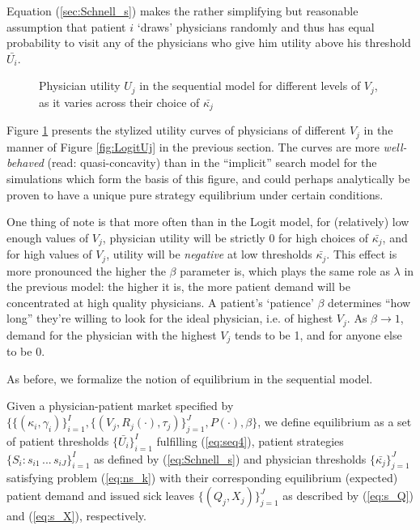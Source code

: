\documentclass[../main.tex]{subfiles}
\begin{document}
Equation (\ref{sec:Schnell_s}) makes the rather simplifying but reasonable assumption that patient $i$ `draws' physicians randomly and thus has equal probability to visit any of the physicians who give him utility above his threshold $\bar{U_i}$.

\vspace{-3em}

\begin{figure}[H]
    \centering
    \begin{tikzpicture}[scale=0.6]
    
    \end{tikzpicture}
    \caption{Physician utility $U_j$ in the sequential model for different levels of $V_j$,\\ as it varies across their choice of $\bar{\kappa_j}$}
    \label{fig:SchnellUj}
\end{figure}

Figure \ref{fig:SchnellUj} presents the stylized utility curves of physicians of different $V_j$ in the manner of Figure \ref{fig:LogitUj} in the previous section. The curves are more \textit{well-behaved} (read: quasi-concavity) than in the ``implicit'' search model for the simulations which form the basis of this figure, and could perhaps analytically be proven to have a unique pure strategy equilibrium under certain conditions.

One thing of note is that more often than in the Logit model, for (relatively) low enough values of $V_j$, physician utility will be strictly 0 for high choices of $\bar{\kappa_j}$, and for high values of $V_j$, utility will be \textit{negative} at low thresholds $\bar{\kappa_j}$. This effect is more pronounced the higher the $\beta$ parameter is, which plays the same role as $\lambda$ in the previous model: the higher it is, the more patient demand will be concentrated at high quality physicians. A patient's `patience' $\beta$ determines ``how long'' they're willing to look for the ideal physician, i.e. of highest $V_j$. As $\beta \rightarrow 1$, demand for the physician with the highest $V_j$ tends to be 1, and for anyone else to be 0.

As before, we formalize the notion of equilibrium in the sequential model.

\vspace{0.5em}
\begin{equilibrium}
    \label{Schnell_eq}
Given a physician-patient market specified by $\{\{(\kappa_i,\gamma_i)\}_{i =1}^{I},\{(V_j, R_j(\cdot), \tau_j)\}_{j =1}^{J}, P(\cdot), \beta \}$, we define equilibrium as a set of patient thresholds $\{\bar{U_i}\}_{i =1}^{I}$ fulfilling (\ref{eq:seq4}), patient strategies $\{S_i: s_{i1} \, ... \, s_{iJ}\}_{i =1}^{I}$ as defined by (\ref{eq:Schnell_s}) and physician thresholds $\{\bar{\kappa_j}\}_{j =1}^{J}$ satisfying problem (\ref{eq:ns_k}) with their corresponding equilibrium (expected) patient demand and issued sick leaves $\{(Q_j,X_j)\}_{j =1}^{J}$ as described by (\ref{eq:s_Q}) and (\ref{eq:s_X}), respectively.
\end{equilibrium}
\end{document}
